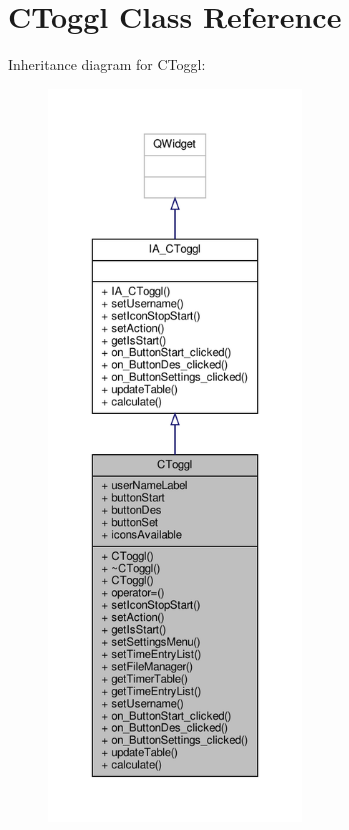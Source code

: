 \hypertarget{classCToggl}{}\section{C\+Toggl Class Reference}
\label{classCToggl}


Inheritance diagram for C\+Toggl\+:
\nopagebreak
\begin{figure}[H]
\begin{center}
\leavevmode
\includegraphics[height=550pt]{classCToggl__inherit__graph}
\end{center}
\end{figure}


